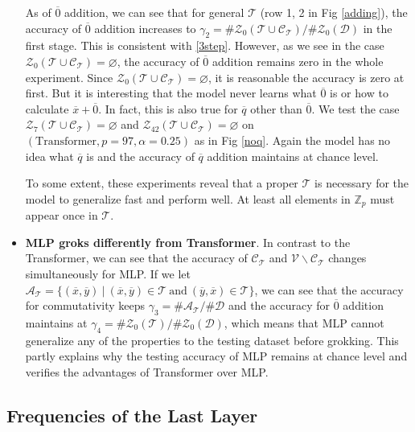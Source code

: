 \documentclass{article}
\begin{document}
\begin{itemize}
    As of $\overline{0}$ addition, we can see that for general $\mathcal{T}$ (row 1, 2 in Fig \ref{adding}), the accuracy of $\overline{0}$ addition increases to $\gamma_2 = \#\mathcal{Z}_0(\mathcal{T}\cup\mathcal{C_T}) / \#\mathcal{Z}_0(\mathcal{D})$ in the first stage. This is consistent with \eqref{3step}. However, as we see in the case $\mathcal{Z}_0(\mathcal{T}\cup\mathcal{C_T}) = \varnothing$, the accuracy of $\overline{0}$ addition remains zero in the whole experiment. Since $\mathcal{Z}_0(\mathcal{T}\cup\mathcal{C_T}) = \varnothing$, it is reasonable the accuracy is zero at first. But it is interesting that the model never learns what $\overline{0}$ is or how to calculate $\overline{x} + \overline{0}$.  In fact, this is also true for $\overline{q}$ other than $\overline{0}$. We test the case $\mathcal{Z}_7(\mathcal{T}\cup\mathcal{C_T}) = \varnothing$ and $\mathcal{Z}_{42}(\mathcal{T}\cup\mathcal{C_T}) = \varnothing$ on $(\text{Transformer}, p = 97, \alpha = 0.25)$ as in Fig \ref{noq}. Again the model has no idea what $\overline{q}$ is and the accuracy of $\overline{q}$ addition maintains at chance level.
    
    To some extent, these experiments reveal that a proper $\mathcal{T}$ is necessary for the model to generalize fast and perform well. At least all elements in $\mathbb{Z}_p$ must appear once in $\mathcal{T}$.

    \item \textbf{MLP groks differently from Transformer}. In contrast to the Transformer, we can see that the accuracy of $\mathcal{C_T}$ and $\mathcal{V}\backslash\mathcal{C_T}$ changes simultaneously for MLP. If we let $\mathcal{A_T} = \lbrace\left.(\overline{x}, \overline{y})\ \right|\ (\overline{x}, \overline{y}) \in \mathcal{T}\ \text{and}\ (\overline{y}, \overline{x}) \in \mathcal{T}\rbrace$, we can see that the accuracy for commutativity keeps $\gamma_3 = \#\mathcal{A_T}/\#\mathcal{D}$ and the accuracy for $\overline{0}$ addition maintains at $\gamma_4 = \#\mathcal{Z}_0(\mathcal{T})/\#\mathcal{Z}_0(\mathcal{D})$, which means that MLP cannot generalize any of the properties to the testing dataset before grokking. This partly explains why the testing accuracy of MLP remains at chance level and verifies the advantages of Transformer over MLP.
\end{itemize}

\subsection{Frequencies of the Last Layer}
\end{document}
